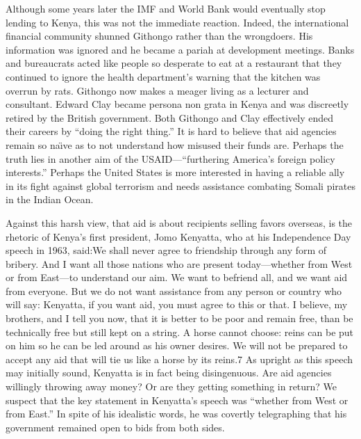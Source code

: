 \documentclass[10pt]{article}
\begin{document}
{\large Although some years later the IMF and World Bank would eventually stop
lending to Kenya, this was not the immediate reaction. Indeed, the international
financial community shunned Githongo rather than the wrongdoers. His information
was ignored and he became a pariah at development meetings. Banks and bureaucrats
acted like people so desperate to eat at a restaurant that they continued to
ignore the health department's warning that the kitchen was overrun by rats.
Githongo now makes a meager living as a lecturer and consultant. Edward Clay
became persona non grata in Kenya and was discreetly retired by the British
government. Both Githongo and Clay effectively ended their careers by ``doing the
right thing.'' It is hard to believe that aid agencies remain so na\"{\i}ve as to
not understand how misused their funds are. Perhaps the truth lies in another aim
of the USAID---``furthering America's foreign policy interests.'' Perhaps the
United States is more interested in having a reliable ally in its fight against
global terrorism and needs assistance combating Somali pirates in the Indian
Ocean.}

{\large Against this harsh view, that aid is about recipients selling favors
overseas, is the rhetoric of Kenya's first president, Jomo Kenyatta, who at his
Independence Day speech in 1963, said:We shall never agree to friendship through
any form of bribery. And I want all those nations who are present today---whether
from West or from East---to understand our aim. We want to befriend all, and we
want aid from everyone. But we do not want assistance from any person or country
who will say: Kenyatta, if you want aid, you must agree to this or that. I
believe, my brothers, and I tell you now, that it is better to be poor and remain
free, than be technically free but still kept on a string. A horse cannot choose:
reins can be put on him so he can be led around as his owner desires. We will not
be prepared to accept any aid that will tie us like a horse by its reins.7 As
upright as this speech may initially sound, Kenyatta is in fact being
disingenuous. Are aid agencies willingly throwing away money? Or are they getting
something in return? We suspect that the key statement in Kenyatta's speech was
``whether from West or from East.'' In spite of his idealistic words, he was
covertly telegraphing that his government remained open to bids from both sides.}
\end{document}
